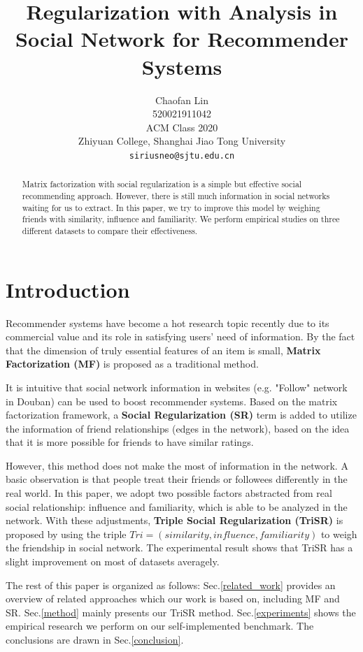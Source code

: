 \documentclass{article}
\title{Regularization with Analysis in Social Network for Recommender Systems}
\author{
  Chaofan Lin \\
    520021911042\\
    ACM Class 2020\\
    Zhiyuan College, Shanghai Jiao Tong University \\
  \texttt{siriusneo@sjtu.edu.cn} \\
}
\begin{document}
\maketitle

\begin{abstract}
  Matrix factorization with social regularization is a simple but effective social 
  recommending approach. However, there is still 
  much information in social networks
  waiting for us to extract.
  In this paper, we try to improve this model 
  by weighing friends with similarity, influence and familiarity.
  We perform empirical studies 
  on three different datasets to compare their effectiveness.
\end{abstract}


\section{Introduction}

Recommender systems have become a hot research topic recently
due to its commercial value and its role in satisfying users'
need of information. By the fact that the dimension of truly essential features of an item is small, 
\textbf{Matrix Factorization (MF)} \cite{ko2009mf} is proposed as a traditional method.

It is intuitive that 
social network information in websites (e.g. "Follow" network in Douban) 
can be used to boost recommender systems. Based on the matrix factorization framework, 
a \textbf{Social Regularization (SR)} \cite{ma2011rsr} term is added to utilize the information of friend relationships 
(edges in the network), based on the idea that it is more possible for friends to 
have similar ratings.

However, this method does not make 
the most of information in the network. A basic observation is that people treat 
their friends or followees differently in the real world.
In this paper, we adopt two possible factors abstracted from real social relationship:
influence and familiarity, which is able to be analyzed in the network. 
With these adjustments, \textbf{Triple Social Regularization (TriSR)} is proposed by using the triple 
$Tri = (similarity, influence, familiarity)$ 
to weigh the friendship in social network. The experimental result shows
that TriSR has a slight improvement on most of datasets averagely.

The rest of this paper is organized as follows: 
Sec.\ref{related_work} 
provides an overview of related approaches which our work is based on, including MF and SR.
Sec.\ref{method} mainly presents our TriSR method. 
Sec.\ref{experiments} shows the empirical research we perform on our 
self-implemented benchmark. The conclusions are drawn in Sec.\ref{conclusion}. 
\end{document}
